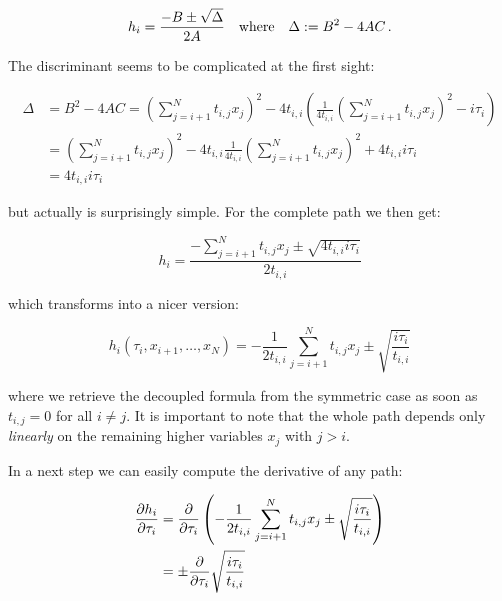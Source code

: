 \documentclass[a4paper,10pt]{article}
\begin{document}
\begin{equation}
  h_i = \frac{-B \pm \sqrt{\Delta}}{2 A}
  \quad \text{where} \quad
  \Delta := B^2 - 4 A C \,.
\end{equation}

The discriminant seems to be complicated at the first sight:

\begin{equation}
\begin{split}
  \Delta & = B^2 - 4 A C
  = \left(\sum_{j=i+1}^{N} t_{i,j} x_j\right)^2
    - 4 t_{i,i} \left(\frac{1}{4 t_{i,i}} \left( \sum_{j=i+1}^{N} t_{i,j} x_j \right)^2 - i \tau_i\right) \\
  & = \left(\sum_{j=i+1}^{N} t_{i,j} x_j\right)^2
      - 4 t_{i,i} \frac{1}{4 t_{i,i}} \left( \sum_{j=i+1}^{N} t_{i,j} x_j \right)^2
      + 4 t_{i,i} i \tau_i \\
  & = 4 t_{i,i} i \tau_i
\end{split}
\end{equation}

but actually is surprisingly simple. For the complete path we
then get:

\begin{equation}
  h_i = \frac{-\sum_{j=i+1}^{N} t_{i,j} x_j \pm \sqrt{4 t_{i,i} i \tau_i}}
             {2 t_{i,i}}
\end{equation}

which transforms into a nicer version:

\begin{equation} \label{eq:general_path_formula}
\boxed{
  h_i\left(\tau_i, x_{i+1}, \ldots, x_N\right)
  = -\frac{1}{2 t_{i,i}} \sum_{j=i+1}^{N} t_{i,j} x_j \pm \sqrt{\frac{i \tau_i}{t_{i,i}}}
}
\end{equation}

where we retrieve the decoupled formula from the symmetric case
as soon as $t_{i,j} = 0$ for all $i \neq j$. It is important to note
that the whole path depends only \emph{linearly} on the remaining
higher variables $x_j$ with $j>i$.

In a next step we can easily compute the derivative of any
path:

\begin{equation}
\begin{split}
  \frac{\partial h_i}{\partial \tau_i}
  & = \frac{\partial }{\partial \tau_i}
      \left(-\frac{1}{2 t_{i,i}} \sum_{j=i+1}^{N} t_{i,j} x_j \pm \sqrt{\frac{i \tau_i}{t_{i,i}}}\right) \\
  & = \pm \frac{\partial }{\partial \tau_i} \sqrt{\frac{i \tau_i}{t_{i,i}}}
\end{split}
\end{equation}
\end{document}
